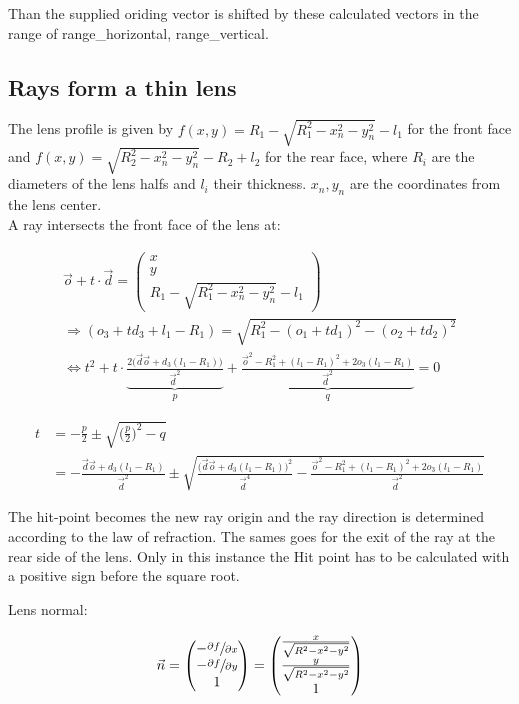 \documentclass[11pt,a4paper,oneside]{article}
\begin{document}
Than the supplied oriding vector is shifted by these calculated vectors in the range of range\_horizontal, range\_vertical.


\subsection{Rays form a thin lens}
The lens profile is given by $f(x,y)= R_1 - \sqrt{R_1^2 -x_n^2 -y_n^2} - l_1$ for the front face and $f(x,y)= \sqrt{R_2^2 -x_n^2 -y_n^2} - R_2 + l_2$  for the rear face, where $R_i$ are the diameters of the lens halfs and $l_i$ their thickness. $x_n, y_n$ are the coordinates from the lens center.\\
A ray intersects the front face of the lens at:

\begin{align}
\vec{o} + t \cdot \vec{d} = \begin{pmatrix} x \\ y \\ R_1 - \sqrt{R_1^2 -x_n^2 -y_n^2} - l_1 \end{pmatrix} \\
\Rightarrow (o_3 + t d_3 + l_1 - R_1) = \sqrt{R_1^2 - (o_1 + t d_1)^2 - (o_2 + t d_2)^2} \\
\Leftrightarrow t^2 + t \cdot \underbrace{ \frac{ 2 \big( \vec{d} \vec{o} + d_3 ( l_1 - R_1 ) \big) }{\vec{d}^2} }_{p} + \underbrace{ \frac{ \vec{o}^2 - R_1^2 +(l_1 - R_1)^2 + 2 o_3 (l_1 - R_1) }{\vec{d}^2} }_{q} = 0
\end{align}

\begin{align}
t &= - \frac{p}{2} \pm \sqrt{\Big( \frac{p}{2} \Big)^2 - q}\\
&= - \frac{\vec{d} \vec{o} + d_3 ( l_1 - R_1 )}{\vec{d}^2} \pm \sqrt{\frac{\big( \vec{d} \vec{o} + d_3 ( l_1 - R_1 ) \big)^2}{\vec{d}^4} - \frac{ \vec{o}^2 - R_1^2 +(l_1 - R_1)^2 + 2 o_3 (l_1 - R_1) }{\vec{d}^2}}
\end{align}

The hit-point becomes the new ray origin and the ray direction is determined according to the law of refraction. The sames goes for the exit of the ray at the rear side of the lens. Only in this instance the Hit point has to be calculated with a positive sign before the square root.

Lens normal:

\begin{align}
\vec{n} = \begin{pmatrix} - \sfrac{\partial f}{\partial x} \\ - \sfrac{\partial f}{\partial y} \\ 1 \end{pmatrix} = \begin{pmatrix} \frac{x}{\sqrt{R^2 - x^2 - y^2}} \\ \frac{y}{\sqrt{R^2 - x^2 - y^2}} \\ 1 \end{pmatrix} \\
\end{align}
\end{document}
